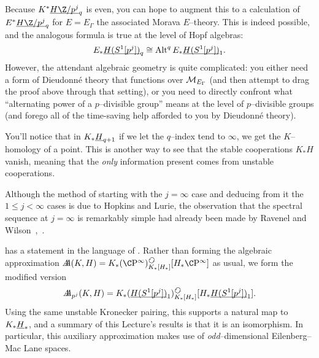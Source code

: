 \begin{remark}\label{EThyOfEMSpaces}
Because $K^* \OS{H\Z/p^j}{q}$ is even, you can hope to augment this to a calculation of $E^* \OS{H\Z/p^j}{q}$ for $E = E_\Gamma$ the associated Morava $E$--theory.  This is indeed possible, and the analogous formula is true at the level of Hopf algebras: \[E_* \underline{\smash{H(S^1[p^j])}}_{q} \cong \operatorname{Alt}^q E_* \underline{\smash{H(S^1[p^j])}}_{1}.\] However, the attendant algebraic geometry is quite complicated: you either need a form of Dieudonn\'e theory that functions over $\mathcal{M}_{E_\Gamma}$ (and then attempt to drag the proof above through that setting), or you need to directly confront what ``alternating power of a $p$--divisible group'' means at the level of $p$--divisible groups (and forego all of the time-saving help afforded to you by Dieudonn\'e theory).
\end{remark}

\begin{remark}
You'll notice that in $K_* \underline{\smash{H}}_{q+1}$ if we let the $q$--index tend to $\infty$, we get the $K$--homology of a point.  This is another way to see that the stable cooperations $K_* H$ vanish, meaning that the \emph{only} information present comes from unstable cooperations.
\end{remark}

\begin{remark}
Although the method of starting with the $j = \infty$ case and deducing from it the $1 \le j < \infty$ cases is due to Hopkins and Lurie, the observation that the spectral sequence at $j = \infty$ is remarkably simple had already been made by Ravenel and Wilson~\cite[Theorem 12.3]{RavenelWilsonKthyOfEMSpaces},~\cite[Theorem 8.1.3]{RWY}.
\end{remark}

\begin{remark}
 has a statement in the language of .  Rather than forming the algebraic approximation $\AA(K, H) = K_*(\CP^\infty)_{K_*[H_*]}^{\circulatearrows}[H_* \CP^\infty]$ as usual, we form the modified version \[\AA_{p^j}(K, H) = K_*(\OS{H(S^1[p^j])}{1})_{K_*[H_*]}^{\circulatearrows}[H_* \OS{H(S^1[p^j])}{1}].\]  Using the same unstable Kronecker pairing, this supports a natural map to $K_* \underline{\smash{H}}_{*}$, and a summary of this Lecture's results is that it is an isomorphism.  In particular, this auxiliary approximation makes use of \emph{odd}--dimensional Eilenberg--Mac Lane spaces.
\end{remark}











